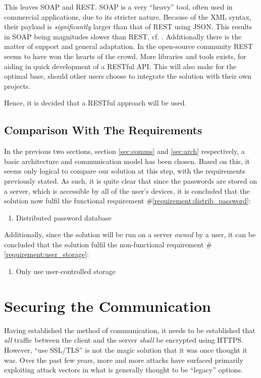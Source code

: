 			This leaves SOAP and REST. SOAP is a very ``heavy'' tool, often used in commercial applications, due to its stricter nature. Because of the XML syntax, their payload is \emph{significantly} larger than that of REST using JSON. This results in SOAP being magnitudes slower than REST, cf. \cite{soap_vs_rest}. Additionally there is the matter of support and general adaptation. In the open-source community REST seems to have won the hearts of the crowd. More libraries and tools exists, for aiding in quick development of a RESTful API. This will also make for the optimal base, should other users choose to integrate the solution with their own projects.

			Hence, it is decided that a RESTful approach will be used. 

		\subsection{Comparison With The Requirements}
			\label{requirement:fulfilled:distrib_password}
			\label{requirement:fulfilled:user_storage}

			In the previous two sections, section \ref{sec:comms} and \ref{sec:arch} respectively, a basic architecture and communication model has been chosen. Based on this, it seems only logical to compare our solution at this step, with the requirements previously stated. As such, it is quite clear that since the passwords are stored on a server, which is accessible by all of the user's devices, it is concluded that the solution now fulfil the functional requirement \#\ref{requirement:distrib_password}:

			\vspace{-3ex}\begin{enumerate}
				\setlength\itemsep{0.1em}
				\item Distributed password database
			\end{enumerate}

			Additionally, since the solution will be run on a server \emph{owned} by a user, it can be concluded that the solution fulfil the non-functional requirement \#\ref{requirement:user_storage}:
			\vspace{-3ex}\begin{enumerate}
				\setlength\itemsep{0.1em}
				\item Only use user-controlled storage
			\end{enumerate}

	\section{Securing the Communication}
		Having established the method of communication, it needs to be established that \emph{all} traffic between the client and the server \emph{shall} be encrypted using HTTPS. However, ``use SSL/TLS'' is not the magic solution that it was once thought it was. Over the past few years, more and more attacks have surfaced primarily exploiting attack vectors in what is generally thought to be ``legacy'' options.

